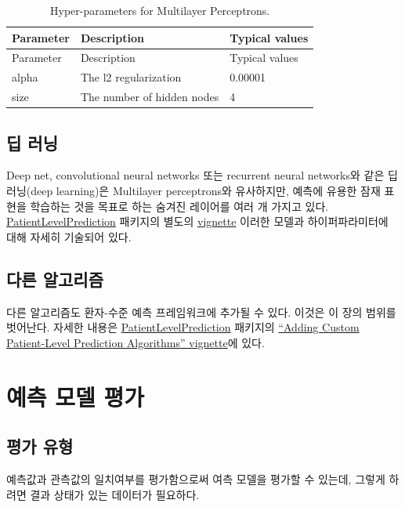 \documentclass[10.5pt]{book}
\theoremstyle{definition}
\theoremstyle{definition}
\theoremstyle{definition}
\theoremstyle{remark}
\begin{document}
\begin{longtable}[]{@{}lll@{}}
\caption{\label{tab:mpParameters} Hyper-parameters for Multilayer
Perceptrons.}\tabularnewline
\toprule
Parameter & Description & Typical values\tabularnewline
\midrule
\endfirsthead
\toprule
Parameter & Description & Typical values\tabularnewline
\midrule
\endhead
alpha & The l2 regularization & 0.00001\tabularnewline
size & The number of hidden nodes & 4\tabularnewline
\bottomrule
\end{longtable}

\subsection{딥 러닝}\label{-}

Deep net, convolutional neural networks 또는 recurrent neural networks와
같은 딥 러닝(deep learning)은 Multilayer perceptrons와 유사하지만,
예측에 유용한 잠재 표현을 학습하는 것을 목표로 하는 숨겨진 레이어를 여러
개 가지고 있다.
\href{https://ohdsi.github.io/PatientLevelPrediction/}{PatientLevelPrediction}
패키지의 별도의
\href{https://ohdsi.github.io/PatientLevelPrediction/articles/BuildingDeepLearningModels.html}{vignette}
이러한 모델과 하이퍼파라미터에 대해 자세히 기술되어
있다. 

\subsection{다른 알고리즘}\label{-}

다른 알고리즘도 환자-수준 예측 프레임워크에 추가될 수 있다. 이것은 이
장의 범위를 벗어난다. 자세한 내용은
\href{https://ohdsi.github.io/PatientLevelPrediction/}{PatientLevelPrediction}
패키지의
\href{https://ohdsi.github.io/PatientLevelPrediction/articles/AddingCustomAlgorithms.html}{``Adding
Custom Patient-Level Prediction Algorithms'' vignette}에 있다.

\section{예측 모델 평가}\label{--}

\subsection{평가 유형}\label{-}

예측값과 관측값의 일치여부를 평가함으로써 여측 모델을 평가할 수 있는데,
그렇게 하려면 결과 상태가 있는 데이터가 필요하다.
\end{document}
